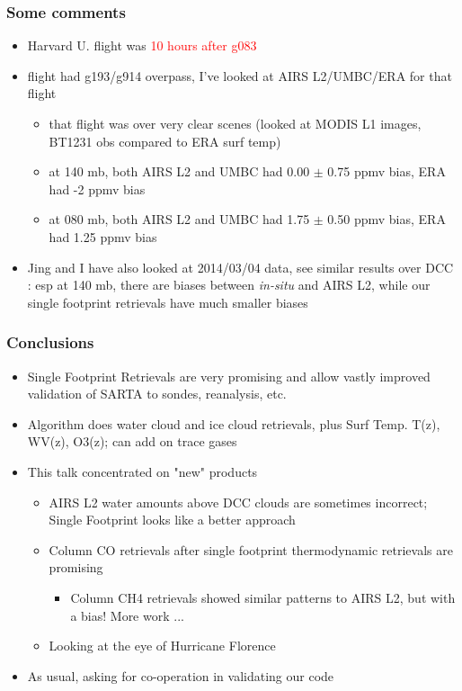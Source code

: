 \documentclass[10pt,t]{beamer}
\begin{document}
\begin{frame}
\frametitle{Some comments}
\begin{itemize}
  \item Harvard U. flight was \textcolor{red}{10 hours after g083}
  \item flight had g193/g914 overpass, I've looked at AIRS L2/UMBC/ERA for that flight
    \begin{itemize}
      \item that flight was over very clear scenes (looked at MODIS L1 images, BT1231 obs compared to ERA surf temp)
      \item at 140 mb, both AIRS L2 and UMBC had 0.00 $\pm$ 0.75 ppmv bias, ERA had -2 ppmv bias
      \item at 080 mb, both AIRS L2 and UMBC had 1.75 $\pm$ 0.50 ppmv bias, ERA had 1.25 ppmv bias      
    \end{itemize}
  \item Jing and I have also looked at 2014/03/04 data, see similar results over DCC : esp at 140 mb, there
        are biases between \emph{in-situ} and AIRS L2, while our single footprint retrievals have much smaller biases    
\end{itemize}
\end{frame}

\begin{frame}
  \frametitle{Conclusions}
  \begin{itemize}
  \item Single Footprint Retrievals are very promising and allow vastly improved validation of SARTA to sondes, reanalysis, etc.
  \item Algorithm does water cloud and ice cloud retrievals, plus Surf Temp. T(z), WV(z), O3(z); can add on trace gases
  \item This talk concentrated on "new" products
    \begin{itemize}
    \item AIRS L2 water amounts above DCC clouds are sometimes incorrect; Single Footprint looks like a better approach
    \item Column CO retrievals after single footprint thermodynamic retrievals are promising
    \begin{itemize}
      \item Column CH4 retrievals showed similar patterns to AIRS L2, but with a bias! More work ...
    \end{itemize}
    \item Looking at the eye of Hurricane Florence
    \end{itemize}
  \item As usual, asking for co-operation in validating our code
  \end{itemize}
\end{frame}
\end{document}
